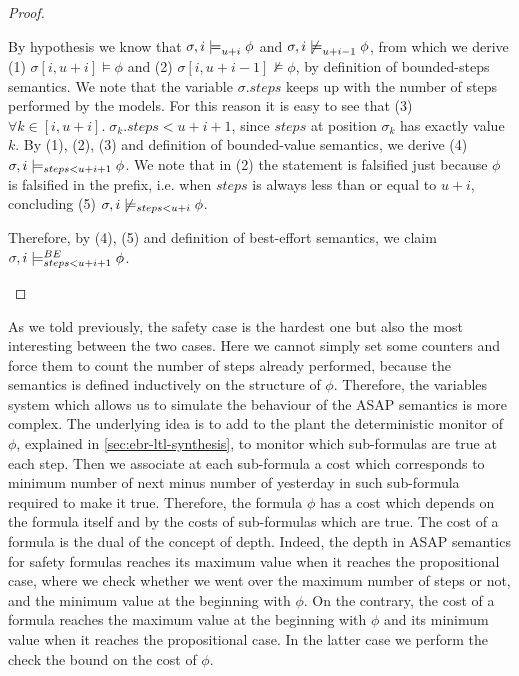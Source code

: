 \begin{theorem}
\begin{proof}
\begin{itemize}
By hypothesis we know that $\sigma,i \models_{u+i}^{} \phi$ and $\sigma,i \not\models_{u+i-1}^{} \phi$, from which we derive (1) $\sigma[i,u+i] \models \phi$ and (2) $\sigma[i,u+i-1] \not\models \phi$, by definition of bounded-steps semantics.
We note that the variable $\sigma.steps$ keeps up with the number of steps performed by the models.
For this reason it is easy to see that (3) $\forall k \in [i,u+i].\; \sigma_k.steps < u+i+1$, since $steps$ at position $\sigma_k$ has exactly value $k$.
By (1), (2), (3) and definition of bounded-value semantics, we derive (4) $\sigma,i \models_{steps < u+i+1} \phi$.
We note that in (2) the statement is falsified just because $\phi$ is falsified in the prefix, i.e. when $steps$ is always less than or equal to $u+i$, concluding (5) $\sigma,i \not\models_{steps < u+i} \phi$.

Therefore, by (4), (5) and definition of best-effort semantics, we claim $\sigma,i \models_{steps < u+i+1}^{BE} \phi$. 
\end{itemize}
\end{proof}
\end{theorem}

As we told previously, the safety case is the hardest one but also the most interesting between the two cases.
Here we cannot simply set some counters and force them to count the number of steps already performed, because the semantics is defined inductively on the structure of $\phi$.
Therefore, the variables system which allows us to simulate the behaviour of the ASAP semantics is more complex.
The underlying idea is to add to the plant the deterministic monitor of $\phi$, explained in \autoref{sec:ebr-ltl-synthesis}, to monitor which sub-formulas are true at each step. 
Then we associate at each sub-formula a cost which corresponds to minimum number of next minus number of yesterday in such sub-formula required to make it true.
Therefore, the formula $\phi$ has a cost which depends on the formula itself and by the costs of sub-formulas which are true.
The cost of a formula is the dual of the concept of depth. 
Indeed, the depth in ASAP semantics for safety formulas reaches its maximum value when it reaches the propositional case, where we check whether we went over the maximum number of steps or not, and the minimum value at the beginning with $\phi$. On the contrary, the cost of a formula reaches the maximum value at the beginning with $\phi$ and its minimum value when it reaches the propositional case.
In the latter case we perform the check the bound on the cost of $\phi$.


